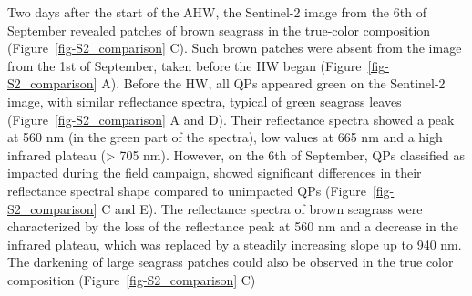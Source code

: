 \documentclass[
  letterpaper,
  11pt,
  english,
  singlespacing,
  headsepline]{MastersDoctoralThesis}
\begin{document}
\begin{spacing}{1.5}
Two days after the start of the AHW, the Sentinel-2 image from the 6th
of September revealed patches of brown seagrass in the true-color
composition (Figure~\ref{fig-S2_comparison} C). Such brown patches were
absent from the image from the 1st of September, taken before the HW
began (Figure~\ref{fig-S2_comparison} A). Before the HW, all QPs
appeared green on the Sentinel-2 image, with similar reflectance
spectra, typical of green seagrass leaves
(Figure~\ref{fig-S2_comparison} A and D). Their reflectance spectra
showed a peak at 560 nm (in the green part of the spectra), low values
at 665 nm and a high infrared plateau (\textgreater{} 705 nm). However,
on the 6th of September, QPs classified as impacted during the field
campaign, showed significant differences in their reflectance spectral
shape compared to unimpacted QPs (Figure~\ref{fig-S2_comparison} C and
E). The reflectance spectra of brown seagrass were characterized by the
loss of the reflectance peak at 560 nm and a decrease in the infrared
plateau, which was replaced by a steadily increasing slope up to 940 nm.
The darkening of large seagrass patches could also be observed in the
true color composition (Figure~\ref{fig-S2_comparison} C)

\begin{figure}

\end{figure}
\end{spacing}
\end{document}
